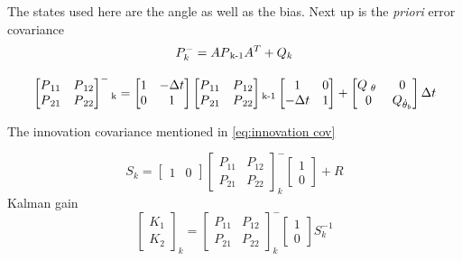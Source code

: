 \documentclass[a4paper,11pt]{kth-mag}
\begin{document}
The states used here  are the angle as well as the bias. Next up is the \textit{priori} error covariance
\begin{equation}
P^-_k = AP\textsubscript{k-1}A^T + Q_k
\end{equation}

\begin{equation}
\begin{bmatrix}
P\textsubscript{11} & P\textsubscript{12} \\
P\textsubscript{21} & P\textsubscript{22}
\end{bmatrix}^-\textsubscript{k} =
\begin{bmatrix}
1  & -\Delta t \\
0   & 1
\end{bmatrix}
\begin{bmatrix}
P\textsubscript{11} & P\textsubscript{12} \\
P\textsubscript{21} & P\textsubscript{22}
\end{bmatrix}\textsubscript{k-1}
\begin{bmatrix}
1 & 0 \\
-\Delta t & 1
\end{bmatrix}
+
\begin{bmatrix}
Q\textsubscript{ $\theta$ } & 0 \\
0 & Q\textsubscript{$\dot{\theta}_b$}
\end{bmatrix}
\Delta t
\end{equation}

The innovation covariance mentioned in \ref{eq:innovation cov}

\begin{equation} 
S_k=
\begin{bmatrix}
1 & 0
\end{bmatrix}
\begin{bmatrix}
P_{11} & P_{12} \\
P_{21} & P_{22} 
\end{bmatrix}^- _k
\begin{bmatrix}
1 \\ 0
\end{bmatrix}
+
R
\end{equation}
Kalman gain
\begin{equation}
\begin{bmatrix}
K_1 \\ K_2
\end{bmatrix}_k
=
\begin{bmatrix}
P_{11} & P_{12} \\
P_{21} & P_{22}
\end{bmatrix}^-_k
\begin{bmatrix}
1 \\ 0
\end{bmatrix}
S^{-1}_k
\end{equation}
\end{document}
